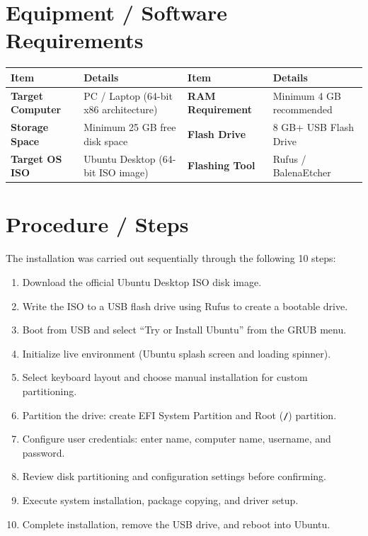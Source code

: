 \documentclass[10pt,a4paper,portrait]{article}
\newcommand{\cmd}[1]{\texttt{\textbf{#1}}}
\begin{document}
\section{Equipment / Software Requirements}
\vspace{-2pt}
\begin{table}[h!]
\centering\footnotesize
\renewcommand{\arraystretch}{1.08}
\begin{tabularx}{\linewidth}{lXlX}
\toprule
\textbf{Item} & \textbf{Details} & \textbf{Item} & \textbf{Details} \\
\midrule
\textbf{Target Computer} & PC / Laptop (64-bit x86 architecture) & \textbf{RAM Requirement} & Minimum 4 GB recommended \\
\textbf{Storage Space} & Minimum 25 GB free disk space & \textbf{Flash Drive} & 8 GB+ USB Flash Drive \\
\textbf{Target OS ISO} & Ubuntu Desktop (64-bit ISO image) & \textbf{Flashing Tool} & Rufus / BalenaEtcher \\
\bottomrule
\end{tabularx}
\end{table}

\section{Procedure / Steps}
The installation was carried out sequentially through the following 10 steps:
\begin{enumerate}[noitemsep,topsep=1pt,leftmargin=1.4em]
  \item Download the official Ubuntu Desktop ISO disk image.
  \item Write the ISO to a USB flash drive using Rufus to create a bootable drive.
  \item Boot from USB and select ``Try or Install Ubuntu'' from the GRUB menu.
  \item Initialize live environment (Ubuntu splash screen and loading spinner).
  \item Select keyboard layout and choose manual installation for custom partitioning.
  \item Partition the drive: create EFI System Partition and Root (\cmd{/}) partition.
  \item Configure user credentials: enter name, computer name, username, and password.
  \item Review disk partitioning and configuration settings before confirming.
  \item Execute system installation, package copying, and driver setup.
  \item Complete installation, remove the USB drive, and reboot into Ubuntu.
\end{enumerate}
\end{document}
